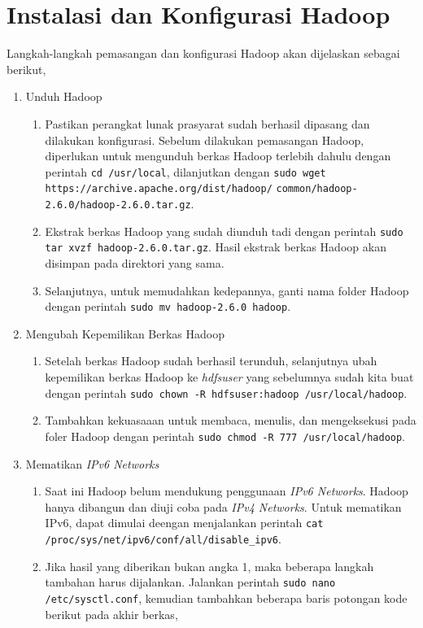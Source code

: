 \chapter{Instalasi dan Konfigurasi Hadoop}
\label{appendix:C}

Langkah-langkah pemasangan dan konfigurasi Hadoop akan dijelaskan sebagai berikut,

\begin{enumerate}
  \item Unduh Hadoop
  \begin{enumerate}
    \item Pastikan perangkat lunak prasyarat sudah berhasil dipasang dan dilakukan konfigurasi. Sebelum dilakukan pemasangan Hadoop, diperlukan untuk mengunduh berkas Hadoop terlebih dahulu dengan perintah \verb|cd /usr/local|, dilanjutkan dengan \verb|sudo wget https://archive.apache.org/dist/hadoop/|
    \newline \verb|common/hadoop-2.6.0/hadoop-2.6.0.tar.gz|.
    \item Ekstrak berkas Hadoop yang sudah diunduh tadi dengan perintah \verb|sudo tar xvzf hadoop-2.6.0.tar.gz|. Hasil ekstrak berkas Hadoop akan disimpan pada direktori yang sama.
    \item Selanjutnya, untuk memudahkan kedepannya, ganti nama folder Hadoop dengan perintah \verb|sudo mv hadoop-2.6.0 hadoop|.
  \end{enumerate}
  \item Mengubah Kepemilikan Berkas Hadoop
  \begin{enumerate}
    \item Setelah berkas Hadoop sudah berhasil terunduh, selanjutnya ubah kepemilikan berkas Hadoop ke \textit{hdfsuser} yang sebelumnya sudah kita buat dengan perintah \verb|sudo chown -R hdfsuser:hadoop /usr/local/hadoop|.
    \item Tambahkan kekuasaaan untuk membaca, menulis, dan mengeksekusi pada foler Hadoop dengan perintah \verb|sudo chmod -R 777 /usr/local/hadoop|.
  \end{enumerate}
  \item Mematikan \textit{IPv6 Networks}
  \begin{enumerate}
    \item Saat ini Hadoop belum mendukung penggunaan \textit{IPv6 Networks}. Hadoop hanya dibangun dan diuji coba pada \textit{IPv4 Networks}. Untuk mematikan IPv6, dapat dimulai deengan menjalankan perintah \verb|cat /proc/sys/net/ipv6/conf/all/disable_ipv6|.
    \item Jika hasil yang diberikan bukan angka 1, maka beberapa langkah tambahan harus dijalankan. Jalankan perintah \verb|sudo nano /etc/sysctl.conf|, kemudian tambahkan beberapa baris potongan kode berikut pada akhir berkas,

\end{enumerate}
\end{enumerate}
